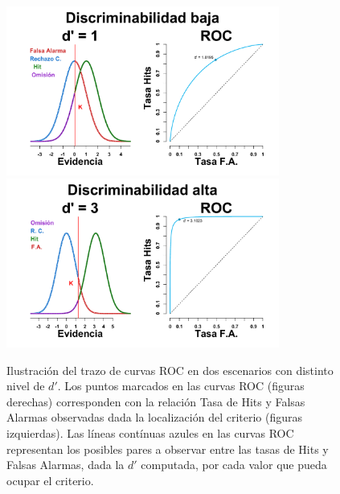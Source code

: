 \begin{figure}[th]
\centering
\includegraphics[width=0.8\textwidth]{Figures/ROC_2} \\
\includegraphics[width=0.8\textwidth]{Figures/ROC_3}\\
\decoRule
\caption[Trazo de curvas ROC]{Ilustración del trazo de curvas ROC en dos escenarios con distinto nivel de $d'$. Los puntos marcados en las curvas ROC (figuras derechas) corresponden con la relación Tasa de Hits y Falsas Alarmas observadas dada la localización del criterio (figuras izquierdas). Las líneas contínuas azules en las curvas ROC representan los posibles pares a observar entre las tasas de Hits y Falsas Alarmas, dada la $d'$ computada, por cada valor que pueda ocupar el criterio.}
\label{fig:Graf_ROC}
\end{figure}


